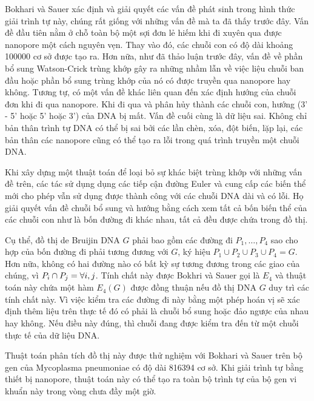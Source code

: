 \documentclass[14pt, a4paper]{article}
\numberwithin{equation}{section}
\numberwithin{figure}{section}
\numberwithin{dl}{section}
\numberwithin{md}{section}
\numberwithin{bd}{section}
\numberwithin{dn}{section}
\numberwithin{hq}{section}
\begin{document}
    Bokhari và Sauer \cite{bokhari2005parallel} xác định và giải quyết các vấn đề phát sinh trong hình thức giải trình tự này, chúng rất giống với những vấn đề mà ta đã thấy trước đây.
    Vấn đề đầu tiên nằm ở chỗ toàn bộ một sợi đơn lẻ hiếm khi đi xuyên qua được nanopore một cách nguyên vẹn.
    Thay vào đó, các chuỗi con có độ dài khoảng 100000 cơ sở được tạo ra.
    Hơn nữa, như đã thảo luận trước đây, vấn đề về phần bổ sung Watson-Crick trùng khớp gây ra những nhầm lẫn về việc liệu chuỗi ban đầu hoặc phần bổ sung trùng khớp của nó có được truyền qua nanopore hay không.
    Tương tự, có một vấn đề khác liên quan đến xác định hướng của chuỗi đơn khi đi qua nanopore.
    Khi đi qua và phân hủy thành các chuỗi con, hướng (3' - 5' hoặc 5' hoặc 3') của DNA bị mất.
    Vấn đề cuối cùng là dữ liệu sai.
    Không chỉ bản thân trình tự DNA có thể bị sai bởi các lần chèn, xóa, đột biến, lặp lại, các bản thân các nanopore cũng có thể tạo ra lỗi trong quá trình truyền một chuỗi DNA.

    Khi xây dựng một thuật toán để loại bỏ sự khác biệt trùng khớp với những vấn đề trên, các tác sử dụng dụng các tiếp cận đường Euler và cung cấp các biến thể mới cho phép vẫn sử dụng được thành công với các chuỗi DNA dài và có lỗi.
    Họ giải quyết vấn đề chuỗi bổ sung và hướng bằng cách xem tất cả bốn biến thể của các chuỗi con như là bốn đường đi khác nhau, tất cả đều được chứa trong đồ thị.

    Cụ thể, đồ thị de Bruijin DNA $G$ phải bao gồm các đường đi $P_1, \dots, P_4$ sao cho hợp của bốn đường đi phải tương đương với $G$, ký hiệu $P_1 \cup P_2 \cup P_3 \cup P_4 = G$.
    Hơn nữa, không có hai đường nào có bất kỳ sự tương đương trong các giao của chúng, vì $P_i \cap P_j = \empty \forall i, j$.
    Tính chất này được Bokhri và Sauer \cite{bokhari2005parallel} gọi là $E_4$ và thuật toán này chứa một hàm $E_4(G)$ được đồng thuận  nếu đồ thị DNA $G$ duy trì các tính chất này.
    Vì việc kiểm tra các đường đi này bằng một phép hoán vị sẽ xác định thêm liệu trên thực tế đó có phải là chuỗi bổ sung hoặc đảo ngược của nhau hay không.
    Nếu điều này đúng, thì chuỗi đang được kiểm tra đến từ một chuỗi thực tế của dữ liệu DNA.

    Thuật toán phân tích đồ thị này được thử nghiệm với Bokhari và Sauer \cite{bokhari2005parallel} trên bộ gen của Mycoplasma pneumoniae có độ dài 816394 cơ sở.
    Khi giải trình tự bằng thiết bị nanopore, thuật toán này có thể tạo ra toàn bộ trình tự của bộ gen vi khuẩn này trong vòng chưa đầy một giờ.
\end{document}
